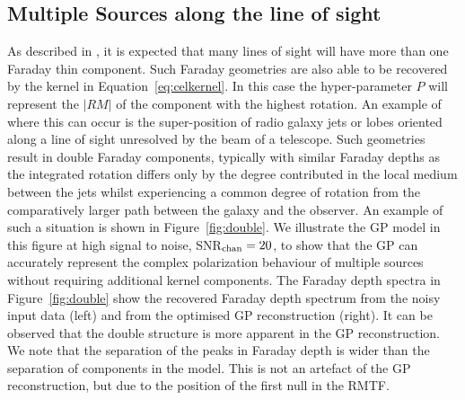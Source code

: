 \documentclass[fleqn,usenatbib]{mnras}
\begin{document}
\subsection{Multiple Sources along the line of sight}
\label{sec:multiple}

As described in \cite{Sun_2015}, it is expected that many lines of sight will have more than one Faraday thin component. Such Faraday geometries are also able to be recovered by the kernel in Equation~\ref{eq:celkernel}. In this case the hyper-parameter $P$ will represent the $|RM|$ of the component with the highest rotation. An example of where this can occur is the super-position of radio galaxy jets or lobes oriented along a line of sight unresolved by the beam of a telescope. Such geometries result in double Faraday components, typically with similar Faraday depths as the integrated rotation differs only by the degree contributed in the local medium between the jets whilst experiencing a common degree of rotation from the comparatively larger path between the galaxy and the observer. An example of such a situation is shown in Figure~\ref{fig:double}. We illustrate the GP model in this figure at high signal to noise, SNR$_{\rm chan} = 20$, to show that the GP can accurately represent the complex polarization behaviour of multiple sources without requiring additional kernel components. The Faraday depth spectra in Figure~\ref{fig:double} show the recovered Faraday depth spectrum from the noisy input data (left) and from the optimised GP reconstruction (right). It can be observed that the double structure is more apparent in the GP reconstruction. We note that the separation of the peaks in Faraday depth is wider than the separation of components in the model. This is not an artefact of the GP reconstruction, but due to the position of the first null in the RMTF.
%
\end{document}
